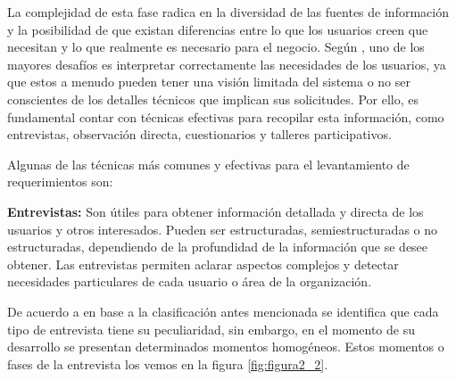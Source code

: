 		La complejidad de esta fase radica en la diversidad de las fuentes de información y la posibilidad de que existan diferencias entre lo que los usuarios creen que necesitan y lo que realmente es necesario para el negocio. Según \textcite{sommerville2011introduccion}, uno de los mayores desafíos es interpretar correctamente las necesidades de los usuarios, ya que estos a menudo pueden tener una visión limitada del sistema o no ser conscientes de los detalles técnicos que implican sus solicitudes. Por ello, es fundamental contar con técnicas efectivas para recopilar esta información, como entrevistas, observación directa, cuestionarios y talleres participativos.
		
		Algunas de las técnicas más comunes y efectivas para el levantamiento de requerimientos son:
		
		\textbf{Entrevistas:} Son útiles para obtener información detallada y directa de los usuarios y otros interesados. Pueden ser estructuradas, semiestructuradas o no estructuradas, dependiendo de la profundidad de la información que se desee obtener. Las entrevistas permiten aclarar aspectos complejos y detectar necesidades particulares de cada usuario o área de la organización.
		
		De acuerdo a \textcite{diaz2013entrevista} en base a la clasificación antes mencionada se identifica que cada tipo de entrevista tiene su peculiaridad, sin embargo, en el momento de su desarrollo se presentan determinados momentos homogéneos. Estos momentos o fases de
		la entrevista los vemos en la figura \ref{fig:figura2_2}.
		
		\vspace{0.3cm} %
		
